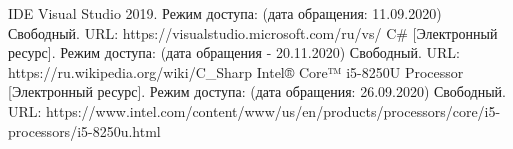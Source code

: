 %




	\begin{center}
	\begin{thebibliography}{3}
	IDE Visual Studio 2019. Режим доступа: (дата обращения: 11.09.2020) Свободный. URL: https://visualstudio.microsoft.com/ru/vs/
	C\# [Электронный ресурс]. Режим доступа: (дата обращения - 20.11.2020) Свободный. URL: https://ru.wikipedia.org/wiki/C\_Sharp	
	Intel® Core™ i5-8250U Processor [Электронный ресурс]. Режим доступа: (дата обращения: 26.09.2020) Свободный. URL: https://www.intel.com/content/www/us/en/products/processors/core/i5-processors/i5-8250u.html


	\end{thebibliography}
	\end{center}